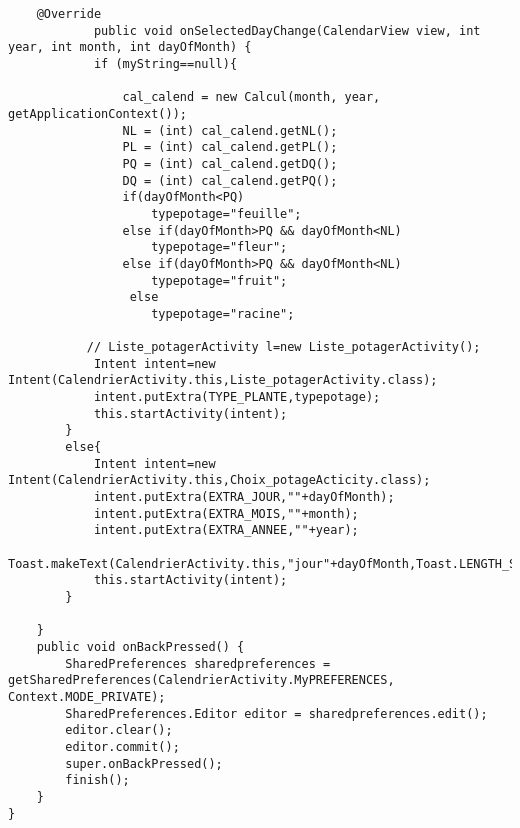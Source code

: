 \begin{lstlisting}
    @Override
            public void onSelectedDayChange(CalendarView view, int year, int month, int dayOfMonth) {
            if (myString==null){

                cal_calend = new Calcul(month, year, getApplicationContext());
                NL = (int) cal_calend.getNL();
                PL = (int) cal_calend.getPL();
                PQ = (int) cal_calend.getDQ();
                DQ = (int) cal_calend.getPQ();
                if(dayOfMonth<PQ)
                    typepotage="feuille";
                else if(dayOfMonth>PQ && dayOfMonth<NL)
                    typepotage="fleur";
                else if(dayOfMonth>PQ && dayOfMonth<NL)
                    typepotage="fruit";
                 else
                    typepotage="racine";

           // Liste_potagerActivity l=new Liste_potagerActivity();
            Intent intent=new Intent(CalendrierActivity.this,Liste_potagerActivity.class);
            intent.putExtra(TYPE_PLANTE,typepotage);
            this.startActivity(intent);
        }
        else{
            Intent intent=new Intent(CalendrierActivity.this,Choix_potageActicity.class);
            intent.putExtra(EXTRA_JOUR,""+dayOfMonth);
            intent.putExtra(EXTRA_MOIS,""+month);
            intent.putExtra(EXTRA_ANNEE,""+year);
            Toast.makeText(CalendrierActivity.this,"jour"+dayOfMonth,Toast.LENGTH_SHORT).show();
            this.startActivity(intent);
        }

    }
    public void onBackPressed() {
        SharedPreferences sharedpreferences = getSharedPreferences(CalendrierActivity.MyPREFERENCES, Context.MODE_PRIVATE);
        SharedPreferences.Editor editor = sharedpreferences.edit();
        editor.clear();
        editor.commit();
        super.onBackPressed();
        finish();
    }
}

		\end{lstlisting}